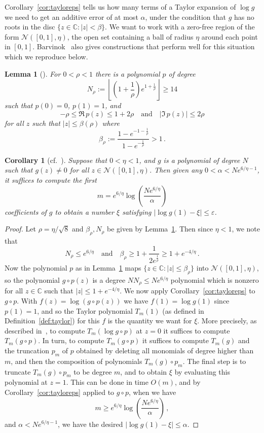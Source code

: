 \documentclass[10pt,a4paper]{article}
\newtheorem{lemma}[theorem]{Lemma}
\newtheorem{corollary}[theorem]{Corollary}
\theoremstyle{definition}
\newcommand*{\CC}{\mathbb{C}}
\newcommand*{\cN}{\mathcal{N}}
\newcommand*{\eps}{\varepsilon}
\begin{document}
%
Corollary~\ref{cor:tayloreps} tells us how many terms of a Taylor expansion of $\log g$ we need to get an additive error of at most $\alpha$, under the condition that $g$ has no roots in the disc $\{z\in\CC : |z|<\beta\}$. 
We want to work with a zero-free region of the form $\cN([0,1],\eta)$, the open set containing a ball of radius $\eta$ around each point in $[0,1]$. 
Barvinok~\cite{Barvinok16,Barvinok18} also gives constructions that perform well for this situation which we reproduce below.
%
\begin{lemma}[{\cite[Lemma 2.2.3]{Barvinok16}}]\label{lem:disctostrip}
For $0<\rho<1$ there is a polynomial $p$ of degree
\[
N_\rho := \left\lfloor\left(1+\frac{1}{\rho}\right)e^{1+\frac{1}{\rho}}\right\rfloor \ge 14
\]
such that $p(0)=0$, $p(1)=1$, and 
\[
-\rho \le \Re\, p(z) \le 1 + 2\rho 
\quad\text{and}\quad
|\Im\, p(z)| \le 2\rho
\]
for all $z$ such that $|z|\le \beta(\rho)$ where
\[
\beta_\rho := \frac{1-e^{-1-\frac{1}{\rho}}}{1-e^{-\frac{1}{\rho}}} > 1\,.
\]
\end{lemma}
%
\begin{corollary}[{cf.~\cite[Theorem 1.6]{Barvinok18}}]\label{cor:stripaccuracy}
Suppose that $0<\eta<1$, and $g$ is a polynomial of degree $N$ such that $g(z)\ne0$ for all $z\in\cN([0,1],\eta)$. 
Then given any $0<\alpha<Ne^{6/\eta-1}$, it suffices to compute the first
\[
m=e^{6/\eta}\log\left(\frac{Ne^{6/\eta}}{\alpha}\right)
\]
coefficients of $g$ to obtain a number $\xi$ satisfying $|\log g(1)-\xi| \le \eps$. 
\end{corollary}
\begin{proof}
Let $\rho=\eta/\sqrt 8$ and $\beta_\rho,N_\rho$ be given by Lemma~\ref{lem:disctostrip}. 
Then since $\eta<1$, we note that
\[
N_\rho\le e^{6/\eta}
\quad\text{and}\quad
\beta_\rho \ge 1 + \frac{1}{2e^{\frac{1}{\rho}}} \ge 1+ e^{-4/\eta}\,.
\]
Now the polynomial $p$ as in Lemma~\ref{lem:disctostrip} maps $\{z\in\CC : |z|\le \beta_\rho\}$ into $\cN([0,1], \eta)$, so the polynomial $g\circ p(z)$ is a degree $NN_\rho \le Ne^{6/\eta}$
polynomial which is nonzero for all $z\in\CC$ such that $|z|\le 1+ e^{-4/\eta}$.
%
We now apply Corollary~\ref{cor:tayloreps} to $g\circ p$. 
With $f(z) = \log(g\circ p(z))$ we have $f(1) = \log g(1)$ since $p(1)=1$, and so the Taylor polynomial $T_m(1)$ (as defined in Definition~\ref{def:taylor}) for this $f$ is the quantity we want for $\xi$.
More precisely, as described in~\cite[Section 2.2.2]{Barvinok16}, to compute $T_m(\log g\circ p)$ at $z=0$ it suffices to compute $T_m(g\circ p)$. 
In turn, to compute $T_m(g\circ p)$ it suffices to compute $T_m(g)$ and the truncation $p_m$ of $p$ obtained by deleting all monomials of degree higher than $m$, and then the composition of polynomials $T_m(g) \circ p_m$.
The final step is to truncate $T_m(g) \circ p_m$ to be degree $m$, and to obtain $\xi$ by evaluating this polynomial at $z=1$.
This can be done in time $O(m)$, and by Corollary~\ref{cor:tayloreps} applied to $g\circ p$, when we have
\[
m \ge e^{6/\eta}\log\left(\frac{Ne^{6/\eta}}{\alpha}\right)\,,
\]
and $\alpha < Ne^{6/\eta-1}$, we have the desired $|\log g(1) - \xi| \le\alpha$.
\end{proof}
\end{document}
